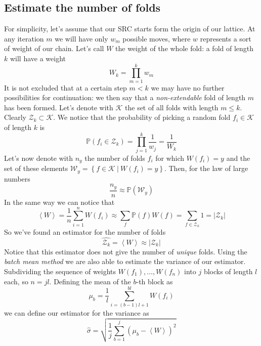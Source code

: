 \subsection{Estimate the number of folds}
For simplicity, let's assume that our SRC starts form the origin of our lattice.
At any iteration $m$ we will have only $w_m$ possible moves, where $w$ represents a sort of weight of our chain.
Let's call $W$ the weight of the whole fold: a fold of length $k$ will have a weight
\begin{equation*}
    W_k = \prod_{m=1}^k w_m
\end{equation*}
It is not excluded that at a certain step $m < k$ we may have no further possibilities for continuation: we then say that a \emph{non-extendable} fold of length $m$ has been formed.
Let's denote with $\mathcal{K}$ the set of all folds with length $m \leq k$.
Clearly $\mathcal{Z}_k \subset \mathcal{K}$.
We notice that the probability of picking a random fold $f_i \in \mathcal{K}$ of length $k$ is
\begin{equation*}
    \mathbb{P}\left(f_i \in \mathcal{Z}_k\right) = \prod_{j=1}^k \frac{1}{w_j} = \frac{1}{W_k}
\end{equation*}
Let's now denote with $n_y$ the number of folds $f_i$ for which $W\left(f_i\right) = y$ and the set of these elements $\mathcal{W}_y = \left\{f \in \mathcal{K} \ | \ W\left(f_i\right) = y\right\}$.
Then, for the law of large numbers
\begin{equation*}
    \frac{n_y}{n} \approx \mathbb{P}\left(\mathcal{W}_y\right)
\end{equation*}
In the same way we can notice that
\begin{equation*}
    \left\langle W \right\rangle = \frac{1}{n} \sum_{i=1}^n W\left(f_i\right) \approx \sum_f \mathbb{P}\left(f\right)W\left(f\right) = \sum_{f \in \mathcal{Z}_k} 1 = \left\lvert \mathcal{Z}_k \right\rvert
\end{equation*}
So we've found an estimator for the number of folds
\begin{equation}
    \hat{\mathcal{Z}_k} = \left\langle W \right\rangle \approx \left\lvert \mathcal{Z}_k \right\rvert
\end{equation}
Notice that this estimator does not give the number of \emph{unique} folds.
Using the \emph{batch mean method} we are also able to estimate the variance of our estimator.
Subdividing the sequence of weights $W\left(f_1\right),\ldots,W\left(f_n\right)$ into $j$ blocks of length $l$ each, so $n = jl$.
Defining the mean of the $b$-th block as
\begin{equation*}
    \mu_b = \frac{1}{l} \sum_{i = (b-1)l + 1}^{bl} W\left(f_i\right)
\end{equation*}
we can define our estimator for the variance as
\begin{equation}
    \hat{\sigma} = \sqrt{\frac{1}{j} \sum_{b = 1}^j \left(\mu_b - \left\langle W \right\rangle\right)^2}
\end{equation}